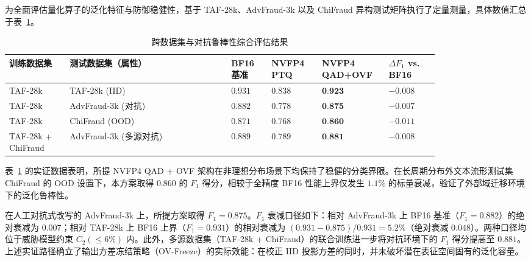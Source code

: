 \documentclass[11pt, a4paper]{article}
\begin{document}
为全面评估量化算子的泛化特征与防御稳健性，基于 TAF-28k、AdvFraud-3k 以及 ChiFraud 异构测试矩阵执行了定量测量，具体数值汇总于表~\ref{tab4}。
\begin{table}[htbp]
\centering
\caption{跨数据集与对抗鲁棒性综合评估结果}
\label{tab4}
\small
\renewcommand{\arraystretch}{1.15}
\begin{tabular}{>{\raggedright\arraybackslash}p{0.12\linewidth}>{\raggedright\arraybackslash}p{0.32\linewidth}>{\centering\arraybackslash}p{0.08\linewidth}>{\centering\arraybackslash}p{0.1\linewidth}>{\centering\arraybackslash}p{0.1\linewidth}>{\centering\arraybackslash}p{0.1\linewidth}}
\toprule
\textbf{训练数据集} & \textbf{测试数据集（属性）} & \textbf{BF16 基准} & \textbf{NVFP4 PTQ} & \textbf{NVFP4 QAD+OVF} & \textbf{$\Delta F_1$ vs. BF16} \\
\midrule
TAF-28k & TAF-28k (IID) & $0.931$ & $0.838$ & $\textbf{0.923}$ & $-0.008$ \\
TAF-28k & AdvFraud-3k (对抗) & $0.882$ & $0.778$ & $\textbf{0.875}$ & $-0.007$ \\
TAF-28k & ChiFraud (OOD) & $0.871$ & $0.768$ & $\textbf{0.860}$ & $-0.011$ \\
TAF-28k + ChiFraud & AdvFraud-3k (多源对抗) & $0.889$ & $0.789$ & $\textbf{0.881}$ & $-0.008$ \\
\bottomrule
\end{tabular}
\end{table}

表~\ref{tab4} 的实证数据表明，所提 NVFP4 QAD + OVF 架构在非理想分布场景下均保持了稳健的分类界限。在长周期分布外文本流形测试集 ChiFraud 的 OOD 设置下，本方案取得 $0.860$ 的 $F_1$ 得分，相较于全精度 BF16 性能上界仅发生 $1.1\%$ 的标量衰减，验证了外部域迁移环境下的泛化鲁棒性。

在人工对抗式改写的 AdvFraud-3k 上，所提方案取得 $F_1=0.875$。$F_1$ 衰减口径如下：相对 AdvFraud-3k 上 BF16 基准（$F_1=0.882$）的绝对衰减为 $0.007$；相对 TAF-28k 上 BF16 上界（$F_1=0.931$）的相对衰减为 $(0.931-0.875)/0.931 = 5.2\%$（绝对衰减 $0.048$）。两种口径均位于威胁模型约束 $C_2(\le 6\%)$ 内。此外，多源数据集（TAF-28k + ChiFraud）的联合训练进一步将对抗环境下的 $F_1$ 得分提高至 $0.881$。上述实证路径确立了输出方差冻结策略（OV-Freeze）的实际效能：在校正 IID 投影方差的同时，并未破坏潜在表征空间固有的泛化容量。

\end{document}
